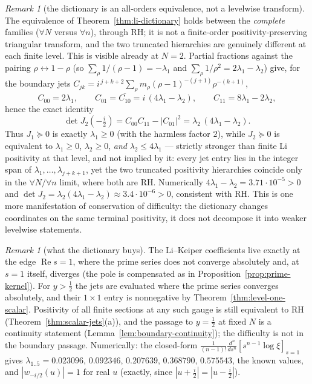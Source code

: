 \documentclass[11pt]{amsart}
\theoremstyle{definition}
\theoremstyle{remark}
\newtheorem{remark}[theorem]{Remark}
\theoremstyle{definition}
\renewcommand{\Re}{\operatorname{Re}}
\newcommand{\half}{\tfrac{1}{2}}
\begin{document}
\begin{remark}[the dictionary is an all-orders equivalence, not a levelwise transform]\label{rmk:li-levelwise}
The equivalence of Theorem~\ref{thm:li-dictionary} holds between the \emph{complete} families
($\forall N$ versus $\forall n$), through RH; it is not a finite-order positivity-preserving triangular
transform, and the two truncated hierarchies are genuinely different at each finite level.  This is
visible already at $N=2$.  Partial fractions against the pairing $\rho\leftrightarrow1-\rho$
(so $\sum_\rho1/(\rho-1)=-\lambda_1$ and $\sum_\rho1/\rho^2=2\lambda_1-\lambda_2$) give, for the
boundary jets $C_{jk}=i^{\,j+k+2}\sum_\rho m_\rho(\rho-1)^{-(j+1)}\rho^{-(k+1)}$,
\[
   C_{00}=2\lambda_1,\qquad
   C_{01}=\overline{C_{10}}=i\,(4\lambda_1-\lambda_2),\qquad
   C_{11}=8\lambda_1-2\lambda_2,
\]
hence the exact identity
\[
   \det J_2(-\tfrac i2)
   =
   C_{00}C_{11}-|C_{01}|^2
   =
   \lambda_2\,(4\lambda_1-\lambda_2).
\]
Thus $J_1\succeq0$ is exactly $\lambda_1\ge0$ (with the harmless factor $2$), while $J_2\succeq0$ is
equivalent to $\lambda_1\ge0$, $\lambda_2\ge0$, \emph{and} $\lambda_2\le4\lambda_1$ --- strictly
stronger than finite Li positivity at that level, and not implied by it: every jet entry lies in the
integer span of $\lambda_1,\ldots,\lambda_{j+k+1}$, yet the two truncated positivity hierarchies
coincide only in the $\forall N/\forall n$ limit, where both are RH.
Numerically $4\lambda_1-\lambda_2=3.71\cdot10^{-5}>0$ and
$\det J_2=\lambda_2(4\lambda_1-\lambda_2)\approx3.4\cdot10^{-6}>0$, consistent with RH.  This is one
more manifestation of conservation of difficulty: the dictionary changes coordinates on the same
terminal positivity, it does not decompose it into weaker levelwise statements.
\end{remark}

\begin{remark}[what the dictionary buys]\label{rmk:li-buys}
The Li--Keiper coefficients live exactly at the edge $\Re s=1$, where the prime series does not converge
absolutely and, at $s=1$ itself, diverges (the pole is compensated as in
Proposition~\ref{prop:prime-kernel}).  For $y>\half$ the jets are evaluated where the prime series converges
absolutely, and their $1\times1$ entry is nonnegative by Theorem~\ref{thm:level-one-scalar}.
Positivity of all finite sections at any such gauge is still equivalent to RH
(Theorem~\ref{thm:scalar-jets}(a)), and the passage to $y=\half$ at fixed $N$ is a continuity
statement (Lemma~\ref{lem:boundary-continuity}); the difficulty is not in the boundary passage.
Numerically: the closed-form $\tfrac1{(n-1)!}\frac{d^n}{ds^n}
[s^{n-1}\log\xi]_{s=1}$ gives $\lambda_{1..5}=0.023096,\,0.092346,\,0.207639,\,0.368790,\,0.575543$,
the known values, and $|w_{-i/2}(u)|=1$ for real $u$ (exactly, since $|u+\tfrac i2|=|u-\tfrac i2|$).
\end{remark}
\end{document}
